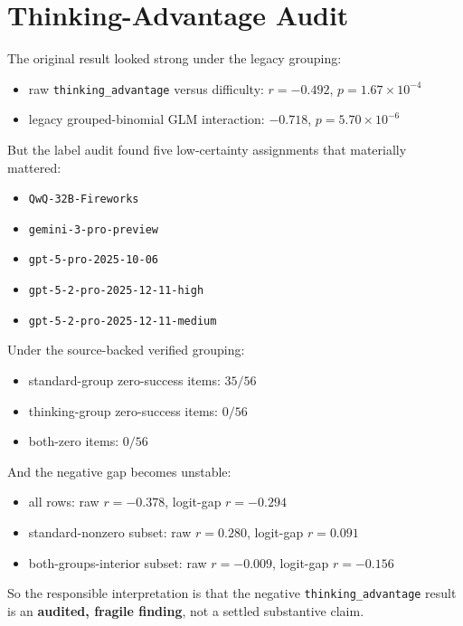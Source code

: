 \documentclass[11pt]{article}
\begin{document}
\section*{Thinking-Advantage Audit}

The original result looked strong under the legacy grouping:

\begin{itemize}
  \item raw \texttt{thinking\_advantage} versus difficulty: $r=-0.492$, $p=1.67\times10^{-4}$
  \item legacy grouped-binomial GLM interaction: $-0.718$, $p=5.70\times10^{-6}$
\end{itemize}

But the label audit found five low-certainty assignments that materially mattered:

\begin{itemize}
  \item \texttt{QwQ-32B-Fireworks}
  \item \texttt{gemini-3-pro-preview}
  \item \texttt{gpt-5-pro-2025-10-06}
  \item \texttt{gpt-5-2-pro-2025-12-11-high}
  \item \texttt{gpt-5-2-pro-2025-12-11-medium}
\end{itemize}

Under the source-backed verified grouping:

\begin{itemize}
  \item standard-group zero-success items: $35/56$
  \item thinking-group zero-success items: $0/56$
  \item both-zero items: $0/56$
\end{itemize}

And the negative gap becomes unstable:

\begin{itemize}
  \item all rows: raw $r=-0.378$, logit-gap $r=-0.294$
  \item standard-nonzero subset: raw $r=0.280$, logit-gap $r=0.091$
  \item both-groups-interior subset: raw $r=-0.009$, logit-gap $r=-0.156$
\end{itemize}

So the responsible interpretation is that the negative \texttt{thinking\_advantage} result is an \textbf{audited, fragile finding}, not a settled substantive claim.
\end{document}
